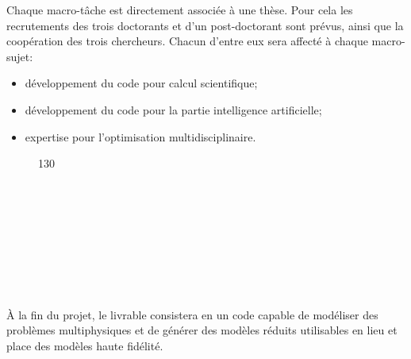 \documentclass[french]{article}
\begin{document}
Chaque macro-tâche est directement associ\'ee \`a une thèse. Pour cela les recrutements des trois doctorants et d'un post-doctorant sont prévus, ainsi que la coopération des trois chercheurs. Chacun d'entre eux sera affecté \`a chaque macro-sujet:
\begin{itemize}
\item développement du code pour calcul scientifique;
\item développement du code pour la partie intelligence artificielle;
\item expertise pour l'optimisation multidisciplinaire.
\end{itemize} 
\begin{figure}[h!]
	\begin{center}
	\begin{ganttchart}[y unit title=0.6cm,
		y unit chart=0.6cm, 
		x unit=0.4cm,
		vgrid,hgrid, 
		title label anchor/.style={below=-1.6ex},
		title left shift=.05,
		title right shift=-.05,
		title height=1,
		progress label text={},
		bar height=0.7,
		group right shift=0,
		group top shift=.6,
		group height=.4]{1}{30}
		 \\
		 \\
		 \\
		 \\
		 \\
		 \\
		 \\
		 \\
		 \\
	\end{ganttchart}
	\end{center}		
\end{figure}

\`A la fin du projet, le livrable consistera en un code capable de modéliser des problèmes multiphysiques et de générer des modèles réduits utilisables en lieu et place des modèles haute fidélité.
\end{document}
